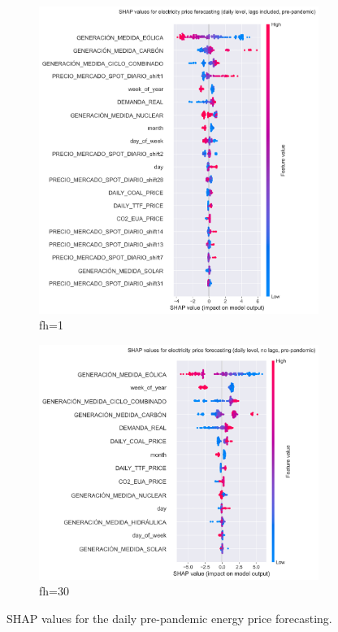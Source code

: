 \begin{figure}[H]
\centering
    \begin{subfigure}{.45\textwidth}
        \centering
        \includegraphics[width=1\linewidth]{images/analysis/shap-daily-pre}
        \caption{fh=1}
    \end{subfigure}
    \begin{subfigure}{.45\textwidth}
        \centering
        \includegraphics[width=1\linewidth]{images/analysis/shap-daily-pre-nolags}
        \caption{fh=30}
    \end{subfigure}

    \caption{SHAP values for the daily pre-pandemic energy price forecasting.}
    \label{fig:shap-daily-pre}
\end{figure}

